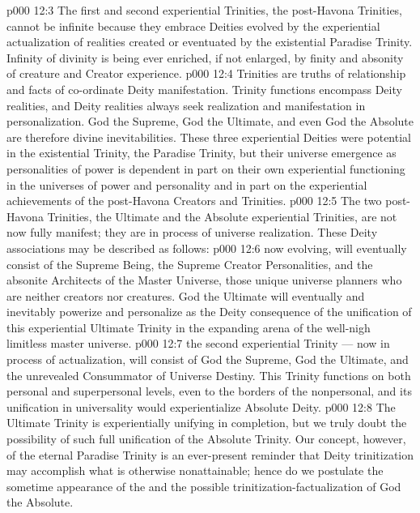 \vs p000 12:3 \pc The first and second experiential Trinities, the post\hyp{}Havona Trinities, cannot be infinite because they embrace  Deities evolved by the experiential actualization of realities created or eventuated by the existential Paradise Trinity. Infinity of divinity is being ever enriched, if not enlarged, by finity and absonity of creature and Creator experience.
\vs p000 12:4 Trinities are truths of relationship and facts of co\hyp{}ordinate Deity manifestation. Trinity functions encompass Deity realities, and Deity realities always seek realization and manifestation in personalization. God the Supreme, God the Ultimate, and even God the Absolute are therefore divine inevitabilities. These three experiential Deities were potential in the existential Trinity, the Paradise Trinity, but their universe emergence as personalities of power is dependent in part on their own experiential functioning in the universes of power and personality and in part on the experiential achievements of the post\hyp{}Havona Creators and Trinities.
\vs p000 12:5 \pc The two post\hyp{}Havona Trinities, the Ultimate and the Absolute experiential Trinities, are not now fully manifest; they are in process of universe realization. These Deity associations may be described as follows:
\vs p000 12:6 \bibnobreakspace {} now evolving, will eventually consist of the Supreme Being, the Supreme Creator Personalities, and the absonite Architects of the Master Universe, those unique universe planners who are neither creators nor creatures. God the Ultimate will eventually and inevitably powerize and personalize as the Deity consequence of the unification of this experiential Ultimate Trinity in the expanding arena of the well\hyp{}nigh limitless master universe.
\vs p000 12:7 \bibnobreakspace {} the second experiential Trinity --- now in process of actualization, will consist of God the Supreme, God the Ultimate, and the unrevealed Consummator of Universe Destiny. This Trinity functions on both personal and superpersonal levels, even to the borders of the nonpersonal, and its unification in universality would experientialize Absolute Deity.
\vs p000 12:8 \pc The Ultimate Trinity is experientially unifying in completion, but we truly doubt the possibility of such full unification of the Absolute Trinity. Our concept, however, of the eternal Paradise Trinity is an ever\hyp{}present reminder that Deity trinitization may accomplish what is otherwise nonattainable; hence do we postulate the sometime appearance of the  and the possible trinitization\hyp{}factualization of God the Absolute.
